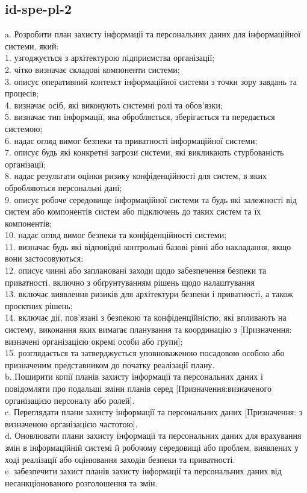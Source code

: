 \documentclass{article}
\begin{document}
\subsection{id-spe-pl-2}
a. Розробити план захисту інформації та персональних даних для інформаційної системи, який:\\ 
1. узгоджується з архітектурою підприємства організації;\\ 
2. чітко визначає складові компоненти системи;\\ 
3. описує оперативний контекст інформаційної системи з точки зору завдань та процесів;\\ 
4. визначає осіб, які виконують системні ролі та обов'язки;\\ 
5. визначає тип інформації, яка обробляється, зберігається та передається системою;\\ 
6. надає огляд вимог безпеки та приватності інформаційної системи;\\ 
7. описує будь які конкретні загрози системи, які викликають стурбованість організації;\\ 
8. надає результати оцінки ризику конфіденційності для систем, в яких обробляються персональні дані;\\ 
9. описує робоче середовище інформаційної системи та будь які залежності від систем або компонентів систем або підключень до таких систем та їх компонентів;\\ 
10. надає огляд вимог безпеки та конфіденційності системи;\\ 
11. визначає будь які відповідні контрольні базові рівні або накладання, якщо вони застосовуються;\\ 
12. описує чинні або заплановані заходи щодо забезпечення безпеки та приватності, включно з обґрунтуванням рішень щодо налаштування\\ 
13. включає виявлення ризиків для архітектури безпеки і приватності, а також проєктних рішень;\\ 
14. включає дії, пов'язані з безпекою та конфіденційністю, які впливають на систему, виконання яких вимагає планування та координацію з [Призначення: визначені організацією окремі особи або групи];\\ 
15. розглядається та затверджується уповноваженою посадовою особою або призначеним представником до початку реалізації плану.\\ 
b. Поширити копії планів захисту інформації та персональних даних і повідомляти про подальші зміни планів серед [Призначення:визначеного організацією персоналу або ролей].\\ 
c. Переглядати плани захисту інформації та персональних даних [Призначення: з визначеною організацією частотою].\\ 
d. Оновлювати плани захисту інформації та персональних даних для врахування змін в інформаційній системі й робочому середовищі або проблем, виявлених у ході реалізації або оцінювання заходів безпеки та приватності.\\ 
e. забезпечити захист планів захисту інформації та персональних даних від несанкціонованого розголошення та змін.
\end{document}

